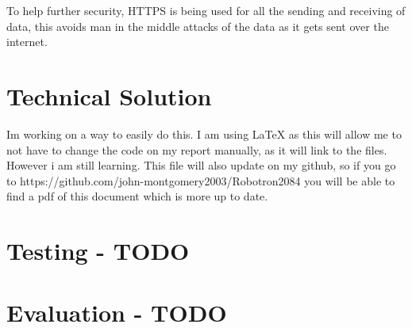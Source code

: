 \documentclass{article}
\begin{document}
To help further security, HTTPS is being used for all the sending and receiving of data, this avoids man in the middle attacks of the data as it gets sent over the internet. 

\newpage
\section{Technical Solution}
Im working on a way to easily do this. I am using LaTeX as this will allow me to not have to change the code on my report manually, as it will link to the files. However i am still learning. This file will also update on my github, so if you go to https://github.com/john-montgomery2003/Robotron2084 you will be able to find a pdf of this document which is more up to date.

\newpage
\section{Testing - TODO}
\section{Evaluation - TODO}
\newpage
\end{document}
